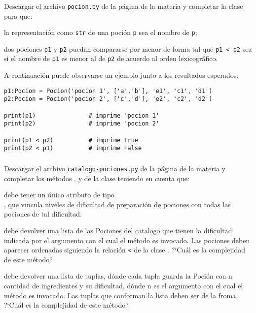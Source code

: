 \begin{frame}[fragile]\frametitle{}
Descargar el archivo {\tt pocion.py} de la p\'agina de la materia y completar la clase  para que:\medskip

 la representaci\'on como {\tt str} de una poci\'on {\tt p} sea el nombre de {\tt p};\medskip

 dos pociones {\tt p1} y {\tt p2} puedan compararse por menor de forma tal que {\tt p1 < p2} sea  si el nombre de {\tt p1} es menor al de {\tt p2} de acuerdo al orden lexicogr\'afico.\bigskip

A continuaci\'on puede observarse un ejemplo junto a los resultados esperados:

\begin{lstlisting}[style=python,numbers=none]
p1:Pocion = Pocion('pocion 1', ['a','b'], 'e1', 'c1', 'd1')
p2:Pocion = Pocion('pocion 2', ['c','d'], 'e2', 'c2', 'd2')

print(p1)               # imprime 'pocion 1'
print(p2)               # imprime 'pocion 2'

print(p1 < p2)          # imprime True
print(p2 < p1)          # imprime False
\end{lstlisting}


\end{frame}
\begin{frame}[fragile]\frametitle{}\footnotesize
Descargar el archivo {\tt catalogo-pociones.py} de la p\'agina de la materia y completar los m\'etodos ,  y   de la clase  teniendo en cuenta que:\bigskip

  debe tener un \'unico atributo de tipo\\
, que vincula niveles de dificultad de preparaci\'on de pociones con todas las pociones de tal dificultad. \medskip

  debe devolver una lista de las Pociones del catalogo que tienen la dificultad indicada por el argumento con el cual el m\'etodo es invocado. Las pociones deben aparecer ordenadas siguiendo la relaci\'on {\tt <} de la clase . ?`Cu\'al es la complejidad de este m\'etodo? \bigskip

  debe devolver una lista de tuplas, d\'onde cada tupla guarda la Poci\'on con n cantidad de ingredientes y su dificultad, d\'onde n es el argumento con el cual el m\'etodo es invocado. Las tuplas que conforman la lista deben ser de la froma {\tt < difucultad, Pocion >}.  ?`Cu\'al es la complejidad de este m\'etodo? \bigskip

\end{frame}

